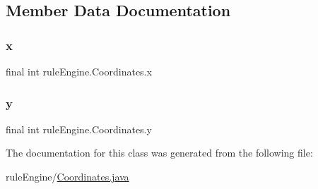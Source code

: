 \subsection{Member Data Documentation}
\mbox{\label{classrule_engine_1_1_coordinates_a31056382eacd17603456770dff83250a}} 
\subsubsection{\texorpdfstring{x}{x}}
{\footnotesize\ttfamily final int rule\+Engine.\+Coordinates.\+x\hspace{0.3cm}{\ttfamily [private]}}

\mbox{\label{classrule_engine_1_1_coordinates_a24ee9a3c2ea5d1d892f8d0955d4cf60f}} 
\subsubsection{\texorpdfstring{y}{y}}
{\footnotesize\ttfamily final int rule\+Engine.\+Coordinates.\+y\hspace{0.3cm}{\ttfamily [private]}}



The documentation for this class was generated from the following file\+:\begin{DoxyCompactItemize}
\item 
rule\+Engine/\mbox{\hyperlink{_coordinates_8java}{Coordinates.\+java}}\end{DoxyCompactItemize}
